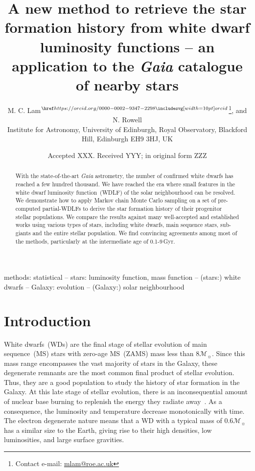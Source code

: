 \documentclass[fleqn,usenatbib]{mnras}
\title[Galactic SFH from \textit{Gaia} GCNS WDLF]{A new method to retrieve the star formation history from white dwarf luminosity functions -- an application to the \textit{Gaia} catalogue of nearby stars}
\author[M. C. Lam et al.]{
M. C. Lam$^{\orcid{0000-0002-9347-2298}}$\thanks{Contact e-mail: \href{mailto:mlam@roe.ac.uk}{mlam@roe.ac.uk}},
and N. Rowell
\\
Institute for Astronomy, University of Edinburgh, Royal Observatory, Blackford Hill, Edinburgh EH9 3HJ, UK
}
\date{Accepted XXX. Received YYY; in original form ZZZ}
\newcommand{\msun}{\mathcal{M}_{\sun}}
\begin{document}
\label{firstpage}
\pagerange{\pageref{firstpage}--\pageref{lastpage}}
\maketitle


\begin{abstract}
With the state-of-the-art \textit{Gaia} astrometry, the number of confirmed
white dwarfs has reached a few hundred thousand. We have reached the era where
small features in the white dwarf luminosity function~(WDLF) of the solar
neighbourhood can be resolved. We demonstrate how to apply Markov chain Monte
Carlo sampling on a set of pre-computed partial-WDLFs to derive the star
formation history of their progenitor stellar populations. We compare the
results against many well-accepted and established works using various types
of stars, including white dwarfs, main sequence stars, sub-giants and 
the entire stellar population. We find convincing
agreements among most of the methods, particularly at the intermediate age
of 0.1-9\,Gyr.

\end{abstract}

\begin{keywords}
methods: statistical -- stars: luminosity function, mass function --
(stars:) white dwarfs -- Galaxy: evolution -- (Galaxy:) solar neighbourhood
\end{keywords}



\section{Introduction}
White dwarfs~(WDs) are the final stage of stellar evolution of main
sequence~(MS) stars with zero-age MS~(ZAMS) mass less than $8\msun$. Since this
mass range encompasses the vast majority of stars in the Galaxy, these
degenerate remnants are the most common final product of stellar evolution.
Thus, they are a good population to study the history of star formation in the
Galaxy. At this late stage of stellar evolution, there is an inconsequential amount of nuclear
base burning to replenish the energy they radiate away~\citep{2010ApJ...717..183R}. As a consequence, the
luminosity and temperature decrease monotonically with time. The electron
degenerate nature means that a WD with a typical mass of $0.6\mathcal{M}_{\sun}$
has a similar size to the Earth, giving rise to their high densities, low
luminosities, and large surface gravities.
\end{document}
